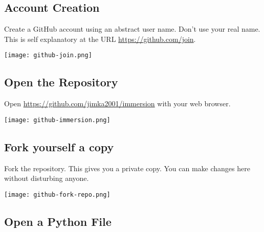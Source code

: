 \subsection{Account Creation}
  
Create a GitHub account using an abstract user name.  Don't use
your real name.  This is self explanatory at the URL
\url{https://github.com/join}.


\noindent\texttt{[image: github-join.png]}



\subsection{Open the Repository}
  
Open \url{https://github.com/jimka2001/immersion} with your web browser.

\noindent\texttt{[image: github-immersion.png]}




\subsection{Fork yourself a copy}

Fork the repository.  This gives you a private copy.  You can make changes
  here without disturbing anyone.  

\noindent \texttt{[image: github-fork-repo.png]}



\subsection{Open a Python File}
  
